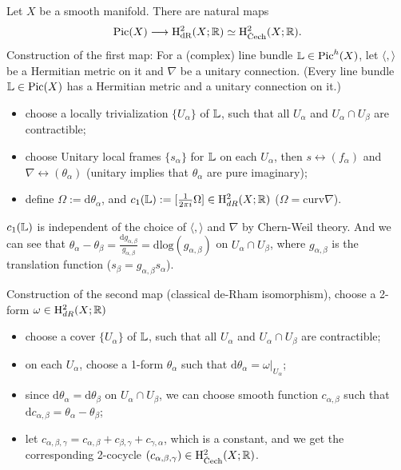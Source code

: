 Let $X$ be a smooth manifold. There are natural maps
\[
    \Pic(X) \longrightarrow  \mathrm{H}^{2}_{\text{dR}}(X;\BR) \simeq  \mathrm{H}^{2}_{\text{\v{C}ech}}(X;\BR).
\]
Construction of the first map:
For a (complex) line bundle $\mathbb{L} \in \operatorname{Pic}^{h}(X)$, let $\langle , \rangle$ be a Hermitian metric on it and $\nabla$ be a unitary connection. (Every line bundle $\mathbb{L} \in \operatorname{Pic}(X)$ has a Hermitian metric and a unitary connection on it.) 
\begin{itemize}
  \item choose a locally trivialization $\{U_{\alpha}\}$ of $\mathbb{L}$, such that all $U_{\alpha}$ and $U_{\alpha} \cap U_{\beta}$ are contractible;
  \item choose Unitary local frames $\{s_{\alpha}\}$ for $\mathbb{L}$ on each $U_{\alpha}$, then $s \leftrightarrow (f_\alpha)$ and $\nabla \leftrightarrow (\theta_\alpha)$ (unitary implies that $\theta_\alpha$ are pure imaginary);
  \item define $\Omega := \mathrm{d}\theta_\alpha$, and $c_1(\mathbb{L}) := [\frac{1}{2\pi i}\Omega] \in \mathrm{H}^{2}_{dR}(X;\mathbb{R})$ ($\Omega = \mathrm{curv}\nabla$).
\end{itemize}
$c_1(\mathbb{L})$ is independent of the choice of $\langle,\rangle$ and $\nabla$ by Chern-Weil theory.
And we can see that $\theta_\alpha - \theta_\beta = \frac{\mathrm{d}g_{\alpha,\beta}}{g_{\alpha,\beta}} = \mathrm{d}\mathrm{log}(g_{\alpha,\beta})$ on $U_\alpha \cap U_\beta$, where $g_{\alpha,\beta}$ is the translation function ($s_\beta = g_{\alpha,\beta}s_\alpha$).

Construction of the second map (classical de-Rham isomorphism), choose a 2-form $\omega \in \mathrm{H}^{2}_{dR}(X;\mathbb{R})$
\begin{itemize}
  \item choose a cover $\{U_{\alpha}\}$ of $\mathbb{L}$, such that all $U_{\alpha}$ and $U_{\alpha} \cap U_{\beta}$ are contractible;
  \item on each $U_\alpha$, choose a 1-form $\theta_\alpha$ such that $\mathrm{d}\theta_\alpha = \omega|_{U_\alpha}$;
  \item since $\mathrm{d}\theta_\alpha = \mathrm{d}\theta_\beta$ on $U_\alpha \cap U_\beta$, we can choose smooth function $c_{\alpha,\beta}$ such that $\mathrm{d}c_{\alpha,\beta} = \theta_\alpha - \theta_\beta$;
  \item let $c_{\alpha,\beta,\gamma} = c_{\alpha,\beta} + c_{\beta,\gamma} + c_{\gamma,\alpha}$, which is a constant, and we get the corresponding 2-cocycle $(c_{\alpha,\beta,\gamma}) \in \mathrm{H}^{2}_{\text{\v{C}ech}}(X;\BR)$.
\end{itemize}

